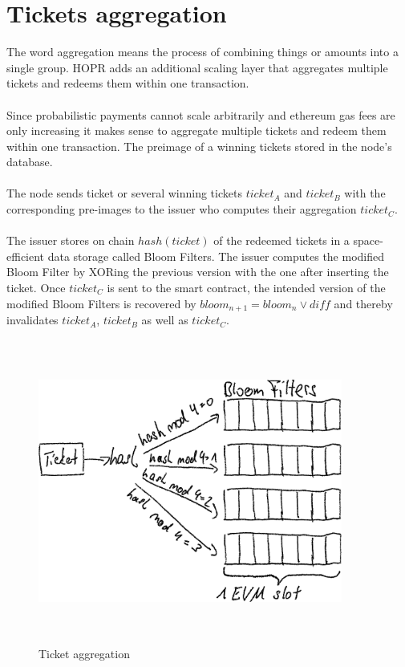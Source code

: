 \section{Tickets aggregation}
The word aggregation means the process of combining things or amounts into a single group. 
HOPR adds an additional scaling layer that aggregates multiple tickets and redeems them within one transaction.
\\~\\ Since probabilistic payments cannot scale arbitrarily and ethereum gas fees are only increasing it makes sense to aggregate multiple tickets and redeem them within one transaction.
The preimage of a winning tickets stored in the node’s database. 
\\~\\ The node sends ticket or several winning tickets $ticket_A$ and $ticket_B$ with the corresponding pre-images to the issuer who computes their aggregation $ticket_C$. 
\\~\\The issuer stores on chain $hash(ticket)$ of the redeemed tickets in a space-efficient data storage called Bloom Filters.
The issuer computes the modified Bloom Filter by XORing the previous version with the one after inserting the ticket.
\newline Once $ticket_C$ is sent to the smart contract, the intended version of the modified Bloom Filters is recovered by $bloom_{n+1} = bloom_n \vee diff$ and thereby invalidates $ticket_A$, $ticket_B$ as well as $ticket_C$.

\begin{figure}[H]
    \centering
    \includegraphics[width=10cm,height=10cm,keepaspectratio]{../whitepaper/images/ticket_aggregation.png}
    \caption{Ticket aggregation}
    \label{fig:Ticket aggregation}
    \end{figure}
